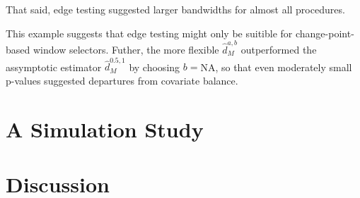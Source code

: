 \documentclass[12pt]{article}\usepackage[]{graphicx}\usepackage[]{color}
\newcommand{\dhat}{\hat{d}}
\begin{document}
That said, edge testing suggested larger bandwidths for almost all
procedures.


This example suggests that edge testing might only be suitible for
change-point-based window selectors.
Futher, the more flexible $\dhat_M^{a,b}$ outperformed the
assymptotic estimator $\dhat_M^{0.5,1}$ by choosing
$b=$NA, so that even moderately small p-values
suggested departures from covariate balance.





\section{A Simulation Study}


\section{Discussion}
\end{document}
